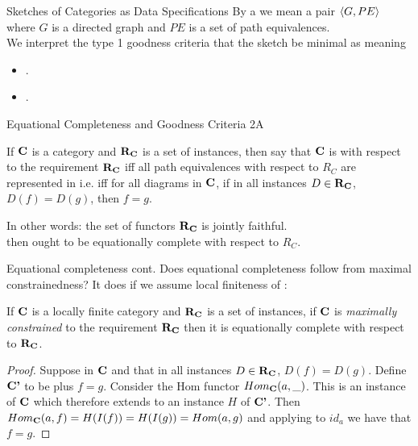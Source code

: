 
\begin{frame}{Sketches of Categories as Data Specifications}
By a  we mean a pair $\langle G,PE\rangle$ where 
$G$ is a directed graph and $PE$ is a set of path equivalences. \\
\medskip
We interpret  the type 1 goodness criteria that the sketch be minimal as meaning 
\begin{itemize}
\item \goodnessoneA. \\
\medskip
\item \goodnessoneB.
\end{itemize}
\end{frame}

\begin{frame}{Equational Completeness and Goodness Criteria 2A}
\pause \begin{definition}
If $\textbf{C}$ is a  category and $\textbf{R}_{\textbf{C}}$ is a set of instances,
 then say that  $\textbf{C}$ is  with respect 
to the requirement $\textbf{R}_{\textbf{C}}$ iff all path equivalences with respect to $R_C$ are represented in \catcw 
i.e. iff for all diagrams \fgparalleldiagram in $\textbf{C}$,  
if in all instances $D \in \textbf{R}_{\textbf{C}}$, $D(f)=D(g)$,  then $f=g$.
\end{definition}
\medskip
\pause In other words:
the set of functors $\textbf{R}_{\textbf{C}}$ is jointly faithful. \\
\medskip
\pause {} \IfSforCwithRCwords then \catcw ought to be equationally complete
with respect to $R_C$.
\end{frame}

\begin{frame}{Equational completeness cont. }
Does equational completeness follow from maximal constrainedness?
It does if we assume local finiteness of \catc:
\begin{lemma}
If $\textbf{C}$ is a locally finite category and $\textbf{R}_{\textbf{C}}$ is a set of instances, if $\textbf{C}$ 
 is
\textit{maximally constrained} to the requirement $\textbf{R}_{\textbf{C}}$ then it is equationally
complete with respect to $\textbf{R}_{\textbf{C}}$.
\end{lemma}
\begin{proof}
Suppose \fgparalleldiagram  in $\textbf{C}$ and that in all instances $D \in \textbf{R}_{\textbf{C}}$, $D(f)=D(g)$. 
Define $\textbf{C'}$ to be \catc plus $f=g$. Consider the Hom functor $Hom_{\textbf{C}}(a,\_)$. 
This is an instance of $\textbf{C}$ which therefore extends to an instance $H$ of $\textbf{C'}$.  Then
$Hom_{\textbf{C}}(a,f)=H(I(f))=H(I(g))=Hom(a,g)$ and applying to $id_a$ we have that $f=g$.
\end{proof}
\end{frame}


